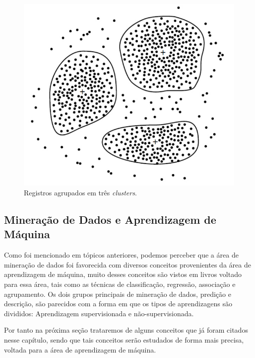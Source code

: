 \begin{figure}[!htp]
	\begin{center}
    \caption{\label{fig:waveform_fig} Registros agrupados em três \textit{clusters}.}
	\includegraphics[scale=0.50]{Figuras/Agrupamento.png}
	\end{center}
\end{figure}



\subsection{Mineração de Dados e Aprendizagem de Máquina}

\par
Como foi mencionado em tópicos anteriores, podemos perceber que a área de mineração de dados foi favorecida com diversos conceitos provenientes da área de aprendizagem de máquina, muito desses conceitos são vistos em livros voltado para essa área, tais como as técnicas de classificação, regressão, associação e agrupamento. Os dois grupos principais de mineração de dados, predição e descrição, são parecidos com a forma em que os tipos de aprendizagens são divididos: Aprendizagem supervisionada e não-supervisionada.

\par
Por tanto na próxima seção trataremos de alguns conceitos que já foram citados nesse capítulo, sendo que tais conceitos serão estudados de forma mais precisa, voltada para a área de aprendizagem de máquina.


